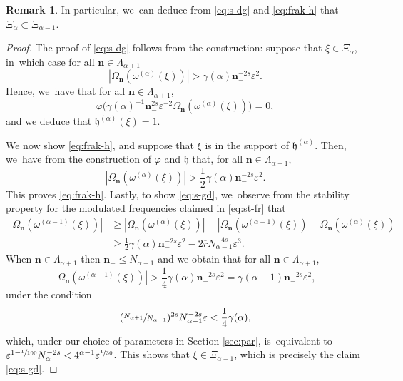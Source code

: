 \documentclass[10pt,a4paper]{amsart}
\theoremstyle{plain}
\theoremstyle{definition}
\newtheorem{remark}[theorem]{Remark}
\newcommand{\nb}{{\boldsymbol n}}
\newcommand{\1}{\mathbf{1}}
\let\epsilon\varepsilon
\begin{document}
\begin{remark} In particular, we~can deduce from \eqref{eq:s-dg} and \eqref{eq:frak-h} that $\Xi_{\alpha}\subset\Xi_{\alpha-1}$.
\end{remark}

\begin{proof} The proof of \eqref{eq:s-dg} follows from the construction: suppose that $\xi\in\Xi_{\alpha}$, in~which case for all $\nb\in\Lambda_{\alpha+1}$
\[
|\Omega_{\nb}(\omega^{(\alpha)}(\xi))|
>
\gamma(\alpha)\nb_{-}^{-2s}\epsilon^{2}.
\]
Hence, we~have that for all $\nb\in\Lambda_{\alpha+1}$,
\[
\varphi
\big(
\gamma(\alpha)^{-1}\nb_{-}^{2s}\epsilon^{-2}\Omega_{\nb}(\omega^{(\alpha)}(\xi))
\big) = 0,
\]
and we deduce that $\mathfrak{h}^{(\alpha)}(\xi)=1$.

We now show \eqref{eq:frak-h}, and suppose that $\xi$ is in the support of $\mathfrak{h}^{(\alpha)}$. Then, we~have from the construction of $\varphi$ and $\mathfrak{h}$ that, for all $\nb\in\Lambda_{\alpha+1}$,
\[
|\Omega_{\nb}(\omega^{(\alpha)}(\xi))|
>
\frac{1}{2} \gamma(\alpha)\nb_{-}^{-2s}\epsilon^{2}.
\]
This proves \eqref{eq:frak-h}. Lastly, to show \eqref{eq:s-gd}, we~observe from the stability property for the modulated frequencies claimed in \eqref{eq:st-fr} that
\begin{align*}
|\Omega_{\nb}(\omega^{(\alpha-1)}(\xi))|
&\geq
|\Omega_{\nb}(\omega^{(\alpha)}(\xi))|-
|\Omega_{\nb}(\omega^{(\alpha-1)}(\xi))-\Omega_{\nb}(\omega^{(\alpha)}(\xi))|
\\
&\geq \frac{1}{2}\gamma(\alpha)\nb_{-}^{-2s}\epsilon^{2} -
2\overline{r}N_{\alpha-1}^{-4s}\epsilon^{3}.
\end{align*}
When $\nb\in\Lambda_{\alpha+1}$ then $\nb_{-}\leq N_{\alpha+1}$ and we obtain that for all $\nb\in\Lambda_{\alpha+1}$,
\[
|\Omega_{\nb}(\omega^{(\alpha-1)}(\xi))| > \frac{1}{4}\gamma(\alpha)\nb_{-}^{-2s}\epsilon^{2} = \gamma(\alpha-1)\nb_{-}^{-2s}\epsilon^{2},
\]
under the condition
\[
(\sfrac{N_{\alpha+1}}{N_{\alpha-1}})^{2s}N_{\alpha-1}^{-2s}\epsilon
<\frac{1}{4}\gamma(\alpha),
\]
which, under our choice of parameters in Section \ref{sec:par}, is~equivalent to
$\epsilon^{1 - \sfrac{1}{100}}N_{\alpha}^{-2s} < 4^{\alpha-1}\epsilon^{\sfrac{1}{30}}$.
This shows that $\xi\in\Xi_{\alpha-1}$, which is precisely the claim \eqref{eq:s-gd}.
\end{proof}
\end{document}
